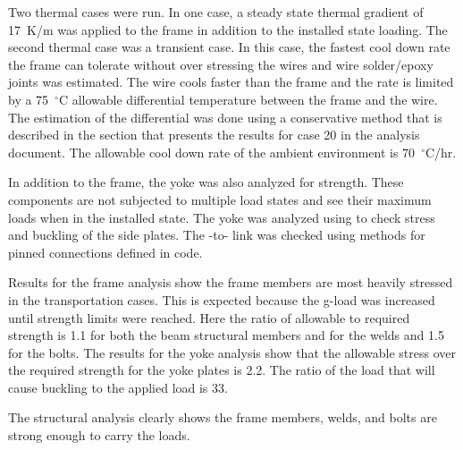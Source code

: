 Two thermal cases were run. In one case, a steady state thermal gradient of \SI{17}{K/m} was applied to the frame in addition to the installed state loading.   The second thermal case was a transient case.  In this case, the fastest cool down rate the   frame can tolerate without over stressing the wires and wire solder/epoxy joints was estimated.  The wire cools faster than the frame and the \cooldown rate is limited by a 75~$^\circ$C allowable differential temperature between the frame and the wire.  The estimation of the differential was done using a conservative method that is described in the section that presents the results for case 20 in the  analysis document.  The allowable cool down rate of the ambient environment is 70~$^\circ$C/hr.

In addition to the frame, the yoke was also analyzed for strength.  These components are not subjected to multiple load states and see their maximum loads when in the installed state.  The yoke was analyzed using  to check stress and buckling of the side plates.  The  -to-  link was checked using methods for pinned connections defined in code.

Results for the frame analysis show the frame members are most heavily stressed in the transportation cases.  This is expected because the g-load was increased until strength limits were reached.  Here the ratio of allowable to required strength is 1.1 for both the beam structural members and for the welds and 1.5 for the bolts.
The results for the yoke analysis show that the allowable stress over the required strength for the yoke plates is 2.2.  The ratio of the load that will cause buckling to the applied load is 33.

The structural analysis clearly shows the   frame members, welds, and bolts are strong enough to carry the loads.
